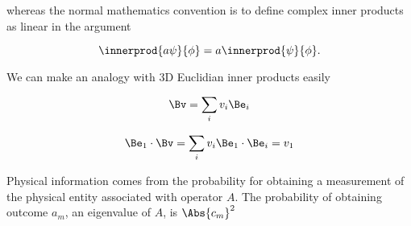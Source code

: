 whereas the normal mathematics convention is to define complex inner products as linear in the  argument

\begin{equation}\label{eqn:PHY356FLecture10:51f}
\innerprod{a \psi}{\phi} = a \innerprod{\psi}{\phi}.
\end{equation}

We can make an analogy with 3D Euclidian inner products easily

\begin{equation}\label{eqn:lecture5BigReviewCh1Formalism:91}
\begin{aligned}
\Bv = \sum_i v_i \Be_i
\end{aligned}
\end{equation}

\begin{equation}\label{eqn:lecture5BigReviewCh1Formalism:111}
\begin{aligned}
\Be_1 \cdot \Bv = \sum_i v_i \Be_1 \cdot \Be_i = v_1
\end{aligned}
\end{equation}

Physical information comes from the probability for obtaining a measurement of the physical entity associated with operator \(A\).  The probability of obtaining outcome \(a_m\), an eigenvalue of \(A\), is \(\Abs{c_m}^2\)


